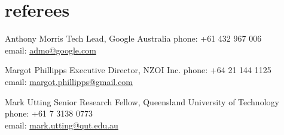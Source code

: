 \documentclass[print]{boris-cv}
\begin{document}
\section{referees}

  {Anthony Morris}
  {Tech Lead, Google Australia}
  {phone: +61 432 967 006
  \\email: \href{mailto:admo@google.com}{admo@google.com}}

  {Margot Phillipps}
  {Executive Director, NZOI Inc.}
  {phone: +64 21 144 1125
  \\email: \href{mailto:margot.phillipps@gmail.com}{margot.phillipps@gmail.com}}

  {Mark Utting}
  {Senior Research Fellow, Queensland University of Technology}
  {phone: +61 7 3138 0773
  \\email: \href{mailto:mark.utting@qut.edu.au}{mark.utting@qut.edu.au}}
\end{document}
